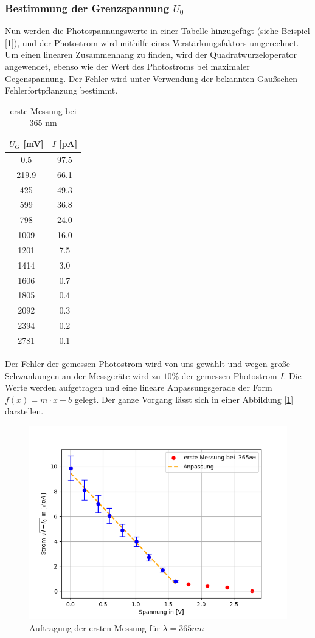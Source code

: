 \documentclass{article}
\begin{document}
\subsubsection*{Bestimmung der Grenzspannung $U_0$}
Nun werden die Photospannungswerte in einer Tabelle hinzugefügt 
(siehe Beispiel [\ref{tab:messung1a_in_main}]), und der Photostrom wird mithilfe 
eines Verstärkungsfaktors umgerechnet. Um einen linearen Zusammenhang zu 
finden, wird der Quadratwurzeloperator angewendet, ebenso wie der Wert des 
Photostroms bei maximaler Gegenspannung. Der Fehler wird unter Verwendung der bekannten
 Gaußschen Fehlerfortpflanzung bestimmt.

\begin{table}[h!]
  \centering
  \begin{tabular}{|c|c|}
      \hline
      $U_G$ [mV] & $I$ [pA] \\
      \hline
      0.5   & 97.5 \\
      219.9 & 66.1 \\
      425   & 49.3 \\
      599   & 36.8 \\
      798   & 24.0 \\
      1009  & 16.0 \\
      1201  & 7.5  \\
      1414  & 3.0  \\
      1606  & 0.7  \\
      1805  & 0.4  \\
      2092  & 0.3  \\
      2394  & 0.2  \\
      2781  & 0.1  \\
      \hline
  \end{tabular}
  \caption{erste Messung bei 365 nm}
  \label{tab:messung1a_in_main}
\end{table}
Der Fehler der gemessen Photostrom wird von uns gewählt und wegen große Schwankungen an der Messgeräte 
wird zu $10\%$ der gemessen Photostrom $I$.
Die Werte werden aufgetragen und eine lineare Anpassungsgerade der Form 
$f(x) = m \cdot x + b $ gelegt. Der ganze Vorgang lässt sich in einer Abbildung [\ref*{fig:wellenlaenge_365nm_a_in_main}]
darstellen. 
\begin{figure}[h!]
  \centering
  \includegraphics[width=.5\linewidth]{402_365nm_a}
  \caption{Auftragung der ersten Messung für $ \lambda =365nm$}
  \label{fig:wellenlaenge_365nm_a_in_main}
\end{figure}
\newpage
\end{document}
